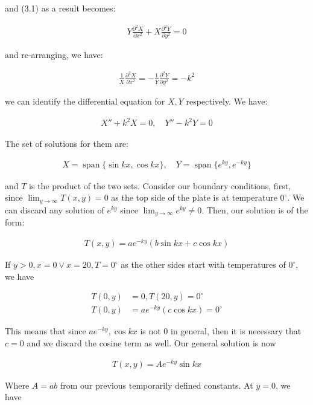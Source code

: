 \documentclass{article}
\numberwithin{equation}{section}
\newcommand{\Set}[1]{\{#1\}}
\DeclareMathOperator{\spn}{span}
\begin{document}
and (3.1) as a result becomes:

\begin{align}
    Y \frac{\partial^2 X}{ \partial x^2} + X \frac{\partial^2 Y}{\partial y^2} = 0
\end{align}

and re-arranging, we have:

\begin{align}
    \frac{1}{X} \frac{\partial^2 X}{ \partial x^2} = - \frac{1}{Y} \frac{\partial^2 Y}{\partial y^2} = -k^2
\end{align}

we can identify the differential equation for $X, Y$ respectively. We have:

\begin{align}
    X'' + k^2 X = 0, \quad Y'' - k^2 Y = 0
\end{align}

The set of solutions for them are:

\begin{align}
    X = \spn\Set{ \sin kx, \cos kx}, \quad Y = \spn\Set{e^{ky}, e^{-ky}}
\end{align}

and $T$ is the product of the two sets. Consider our boundary conditions, first, since $\lim_{y\to \infty} T(x,y) = 0$ as the top side of the plate is at temperature $0^\circ$. We can discard any solution of $e^{ky}$ since $\lim_{y\to \infty} e^{ky} \neq 0$. Then, our solution is of the form:

\begin{align}
    T(x,y) = a e^{-ky} (b \sin kx + c\cos kx)
\end{align}

If $y > 0, x = 0 \vee x = 20, T = 0 ^\circ$ as the other sides start with temperatures of $0^\circ$, we have

\begin{align}
    T(0, y) &= 0, T(20, y) = 0^\circ \\
    T(0, y) &= a e^{-ky} (c \cos kx) = 0^\circ
\end{align}

This means that since $a e^{-ky}, \cos kx$ is not 0 in general, then it is necessary that $c = 0$ and we discard the cosine term as well. Our general solution is now

\begin{align}
    T(x,y) = A e^{-ky} \sin kx
\end{align}

Where $A = ab$ from our previous temporarily defined constants. At $y = 0$, we have 
\end{document}
